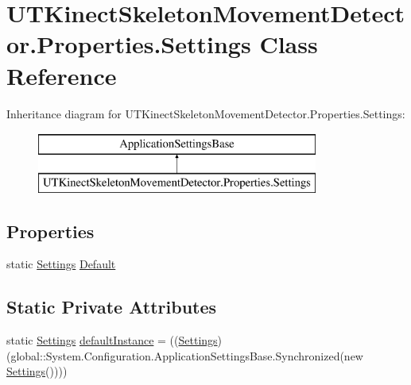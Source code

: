 \hypertarget{classUTKinectSkeletonMovementDetector_1_1Properties_1_1Settings}{\section{U\-T\-Kinect\-Skeleton\-Movement\-Detector.\-Properties.\-Settings Class Reference}
\label{classUTKinectSkeletonMovementDetector_1_1Properties_1_1Settings}
}
Inheritance diagram for U\-T\-Kinect\-Skeleton\-Movement\-Detector.\-Properties.\-Settings\-:\begin{figure}[H]
\begin{center}
\leavevmode
\includegraphics[height=2.000000cm]{classUTKinectSkeletonMovementDetector_1_1Properties_1_1Settings}
\end{center}
\end{figure}
\subsection*{Properties}
\begin{DoxyCompactItemize}
\item 
static \hyperlink{classUTKinectSkeletonMovementDetector_1_1Properties_1_1Settings}{Settings} \hyperlink{classUTKinectSkeletonMovementDetector_1_1Properties_1_1Settings_a0aadb4f47abf4b0b09d34f2f561be8dd}{Default}
\end{DoxyCompactItemize}
\subsection*{Static Private Attributes}
\begin{DoxyCompactItemize}
\item 
static \hyperlink{classUTKinectSkeletonMovementDetector_1_1Properties_1_1Settings}{Settings} \hyperlink{classUTKinectSkeletonMovementDetector_1_1Properties_1_1Settings_ae19796fbb92846fa41f12dd457beaa2b}{default\-Instance} = ((\hyperlink{classUTKinectSkeletonMovementDetector_1_1Properties_1_1Settings}{Settings})(global\-::\-System.\-Configuration.\-Application\-Settings\-Base.\-Synchronized(new \hyperlink{classUTKinectSkeletonMovementDetector_1_1Properties_1_1Settings}{Settings}())))
\end{DoxyCompactItemize}


